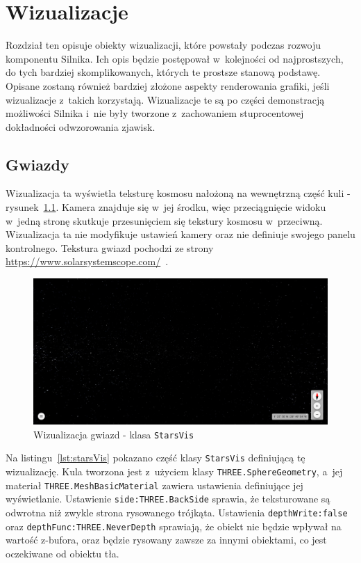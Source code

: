 \chapter{Wizualizacje}

Rozdział ten opisuje obiekty wizualizacji, które powstały podczas rozwoju komponentu Silnika. Ich opis będzie postępował w~kolejności od najprostszych, do tych bardziej skomplikowanych, których te prostsze stanową podstawę. Opisane zostaną również bardziej złożone aspekty renderowania grafiki, jeśli wizualizacje z~takich korzystają.
Wizualizacje te są po części demonstracją możliwości Silnika i~nie były tworzone z~zachowaniem stuprocentowej dokładności odwzorowania zjawisk.

\section{Gwiazdy}

Wizualizacja ta wyświetla teksturę kosmosu nałożoną na wewnętrzną część kuli - rysunek~\ref{fig:c4_starsVis}. Kamera znajduje się w~jej środku, więc przeciągnięcie widoku w~jedną stronę skutkuje przesunięciem się tekstury kosmosu w~przeciwną. Wizualizacja ta nie modyfikuje ustawień kamery oraz nie definiuje swojego panelu kontrolnego. Tekstura gwiazd pochodzi ze strony \url{https://www.solarsystemscope.com/}~\cite{SolarTextures}. 

\begin{figure}[h]
  \centering
  \includegraphics[width=\linewidth]{img/c4_starsVis.png}
  \caption{Wizualizacja gwiazd - klasa \texttt{StarsVis}}
  \label{fig:c4_starsVis} 
\end{figure}

Na listingu~\ref{lst:starsVis} pokazano część klasy \texttt{StarsVis} definiującą tę wizualizację. Kula tworzona jest z~użyciem klasy \texttt{THREE.SphereGeometry}, a~jej materiał \texttt{THREE.MeshBasicMaterial} zawiera ustawienia definiujące jej wyświetlanie. Ustawienie \mbox{\texttt{side:THREE.BackSide}} sprawia, że teksturowane są odwrotna niż zwykle strona rysowanego trójkąta. Ustawienia \mbox{\texttt{depthWrite:false}} oraz \mbox{\texttt{depthFunc:THREE.NeverDepth}} sprawiają, że obiekt nie będzie wpływał na wartość z-bufora, oraz będzie rysowany zawsze za innymi obiektami, co jest oczekiwane od obiektu tła. 


